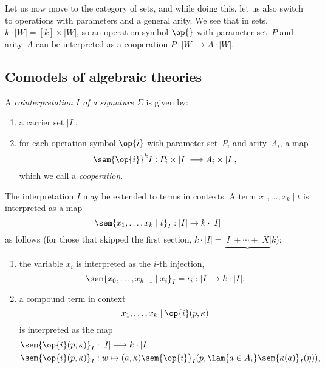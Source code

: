Let us now move to the category of sets, and while doing this, let us also switch to operations with parameters and a general arity. We see that in sets, $k \cdot |W| = [k] \times |W|$, so an operation symbol $\op{}$ with parameter set~$P$ and arity~$A$ can be interpreted as a cooperation $P \cdot |W| \to A \cdot |W|$.

\subsection{Comodels of algebraic theories}
\label{sec:comodels}

A \emph{cointerpretation $I$ of a signature $\Sigma$} is given by:
%
\begin{enumerate}
\item a carrier set $|I|$,
\item for each operation symbol $\op{i}$ with parameter set~$P_i$ and arity~$A_i$,
  a map
  \begin{equation*}
    \sem{\op{i}}^kI : P_i \times |I| \longrightarrow A_i \times |I|,
  \end{equation*}
  which we call a \emph{cooperation}.
\end{enumerate}
%
The interpretation $I$ may be extended to terms in contexts. A term
$x_1, \ldots, x_k \mid t$ is interpreted as a map
%
\begin{equation*}
  \sem{x_1, \ldots, x_k \mid t}_I : |I| \to k \cdot |I|
\end{equation*}
%
as follows (for those that skipped the first section, $k \cdot |I| = \underbrace{|I| + \cdots + |X|}k$):
%
\begin{enumerate}
\item the variable $x_i$ is interpreted as the $i$-th injection,
  \begin{equation*}
    \sem{x_0, \ldots, x_{k-1} \mid  x_i}_I = \iota_i : |I| \to k \cdot |I|,
  \end{equation*}
\item a compound term in context
  \begin{equation*}
    x_1, \ldots, x_k \mid \op{i}(p, \kappa)
  \end{equation*}
  is interpreted as the map
  \begin{align*}
    \sem{\op{i}(p, \kappa)}_I &: |I| \longrightarrow k \cdot |I| \\
    \sem{\op{i}(p, \kappa)}_I &:
      w \mapsto (a, \kappa)
      \sem{\op{i}}_I(p, \lam{a \in A_i} \sem{\kappa(a)}_I(\eta)),
  \end{align*}
\end{enumerate}

